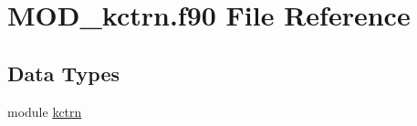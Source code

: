 \hypertarget{MOD__kctrn_8f90}{\section{M\-O\-D\-\_\-kctrn.\-f90 File Reference}
\label{MOD__kctrn_8f90}
}
\subsection*{Data Types}
\begin{DoxyCompactItemize}
\item 
module \hyperlink{classkctrn}{kctrn}
\end{DoxyCompactItemize}
